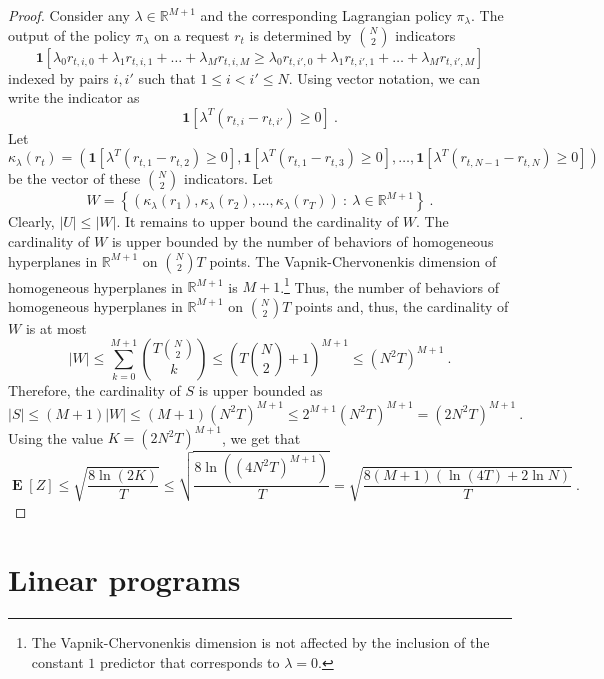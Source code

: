 \documentclass[12pt]{article}
\newcommand{\R}{\mathbb{R}}
\DeclareMathOperator*{\Exp}{\mathbf{E}}
\theoremstyle{definition}
\begin{document}
\begin{proof}
Consider any $\lambda \in \R^{M+1}$ and the corresponding Lagrangian policy
$\pi_\lambda$. The output of the policy $\pi_\lambda$ on a request $r_t$ is
determined by $\binom{N}{2}$ indicators
$$
\mathbf{1} \left[\lambda_0 r_{t,i,0} + \lambda_1 r_{t,i,1} + \dots + \lambda_M r_{t,i,M} \ge \lambda_0 r_{t,i',0} + \lambda_1 r_{t,i',1} + \dots + \lambda_M r_{t,i',M}\right]
$$
indexed by pairs $i,i'$ such that $1 \le i < i' \le N$. Using vector notation, we can write the indicator as
$$
\mathbf{1} \left[ \lambda^T (r_{t,i} - r_{t,i'}) \ge 0 \right] \: .
$$
Let
$$
\kappa_\lambda(r_t) = (\mathbf{1} \left[ \lambda^T (r_{t,1} - r_{t,2}) \ge 0 \right], \mathbf{1} \left[ \lambda^T (r_{t,1} - r_{t,3}) \ge 0 \right], \dots, \mathbf{1} \left[ \lambda^T (r_{t,N-1} - r_{t,N}) \ge 0 \right])
$$
be the vector of these $\binom{N}{2}$ indicators. Let
$$
W = \left\{ (\kappa_\lambda(r_1), \kappa_\lambda(r_2), \dots, \kappa_\lambda(r_T)) ~:~ \lambda \in \R^{M+1} \right\} \: .
$$
Clearly, $|U| \le |W|$. It remains to upper bound the cardinality of $W$. The
cardinality of $W$ is upper bounded by the number of behaviors of homogeneous
hyperplanes in $\R^{M+1}$ on $\binom{N}{2} T$ points. The Vapnik-Chervonenkis
dimension of homogeneous hyperplanes in $\R^{M+1}$ is $M+1$.\footnote{The
Vapnik-Chervonenkis dimension is not affected by the inclusion of the constant
$1$ predictor that corresponds to $\lambda = 0$.} Thus, the number of behaviors
of homogeneous hyperplanes in $\R^{M+1}$ on $\binom{N}{2} T$ points and, thus,
the cardinality of $W$ is at most
$$
|W| \le \sum_{k=0}^{M+1} \binom{T \binom{N}{2}}{k} \le \left(T \binom{N}{2} + 1 \right)^{M+1} \le (N^2T)^{M+1} \: .
$$
Therefore, the cardinality of $S$ is upper bounded as
$$
|S| \le (M+1) |W| \le (M+1) \left(N^2T \right)^{M+1} \le 2^{M+1} \left(N^2T \right)^{M+1} = \left(2N^2T \right)^{M+1} \: .
$$
Using the value $K=\left(2N^2T \right)^{M+1}$, we get that
$$
\Exp[Z] \le \sqrt{\frac{8 \ln(2K)}{T}} \le \sqrt{\frac{8 \ln((4N^2T)^{M+1})}{T}} = \sqrt{\frac{8(M+1) (\ln(4T) + 2 \ln N)}{T}} \: .
$$
\end{proof}


\section{Linear programs}
\end{document}
